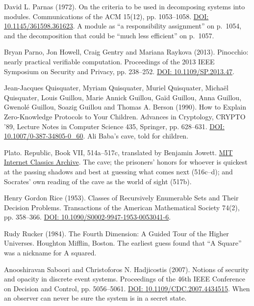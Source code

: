 \documentclass[11pt,twoside]{article}
\theoremstyle{thielethm}
\theoremstyle{thieledef}
\theoremstyle{thieledef}
\theoremstyle{thieledef}
\theoremstyle{thielethm}
\theoremstyle{thieleobs}
\theoremstyle{thielethm}
\begin{document}
\noindent David L. Parnas (1972). On the criteria to be used in decomposing systems into modules. Communications of the ACM 15(12), pp. 1053--1058. \href{https://doi.org/10.1145/361598.361623}{DOI: 10.1145/361598.361623}. A module as ``a responsibility assignment'' on p.~1054, and the decomposition that could be ``much less efficient'' on p.~1057.
\par\medskip

\noindent Bryan Parno, Jon Howell, Craig Gentry and Mariana Raykova (2013). Pinocchio: nearly practical verifiable computation. Proceedings of the 2013 IEEE Symposium on Security and Privacy, pp. 238--252. \href{https://doi.org/10.1109/SP.2013.47}{DOI: 10.1109/SP.2013.47}.
\par\medskip

\noindent Jean-Jacques Quisquater, Myriam Quisquater, Muriel Quisquater, Micha\"el Quisquater, Louis Guillou, Marie Annick Guillou, Ga\"id Guillou, Anna Guillou, Gwenol\'e Guillou, Soazig Guillou and Thomas A. Berson (1990). How to Explain Zero-Knowledge Protocols to Your Children. Advances in Cryptology, CRYPTO '89, Lecture Notes in Computer Science 435, Springer, pp. 628--631. \href{https://doi.org/10.1007/0-387-34805-0_60}{DOI: 10.1007/0-387-34805-0\_60}. Ali Baba's cave, told for children.
\par\medskip

\noindent Plato. Republic, Book VII, 514a--517c, translated by Benjamin Jowett. \href{https://classics.mit.edu/Plato/republic.8.vii.html}{MIT Internet Classics Archive}. The cave; the prisoners' honors for whoever is quickest at the passing shadows and best at guessing what comes next (516c--d); and Socrates' own reading of the cave as the world of sight (517b).
\par\medskip

\noindent Henry Gordon Rice (1953). Classes of Recursively Enumerable Sets and Their Decision Problems. Transactions of the American Mathematical Society 74(2), pp. 358--366. \href{https://doi.org/10.1090/S0002-9947-1953-0053041-6}{DOI: 10.1090/S0002-9947-1953-0053041-6}.
\par\medskip

\noindent Rudy Rucker (1984). The Fourth Dimension: A Guided Tour of the Higher Universes. Houghton Mifflin, Boston. The earliest guess found that ``A Square'' was a nickname for A squared.
\par\medskip

\noindent Anooshiravan Saboori and Christoforos N. Hadjicostis (2007). Notions of security and opacity in discrete event systems. Proceedings of the 46th IEEE Conference on Decision and Control, pp. 5056--5061. \href{https://doi.org/10.1109/CDC.2007.4434515}{DOI: 10.1109/CDC.2007.4434515}. When an observer can never be sure the system is in a secret state.
\par\medskip
\end{document}
